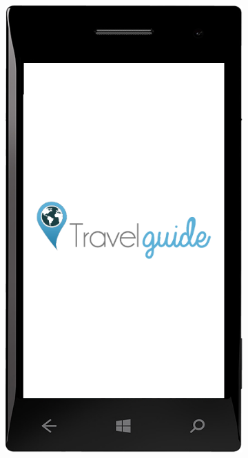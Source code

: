 \documentclass{book}
\begin{document}
				\begin{figure}[H]
					
					\begin{subfigure}{0.3\textwidth}
						\includegraphics[width=\textwidth]{screenshots/mobile/mobile1.png}					
						\caption{\label{subfig:mobile_splash}}
					\end{subfigure}
					\hfill
					\begin{subfigure}{0.3\textwidth}

\end{subfigure}
\end{figure}
\end{document}
